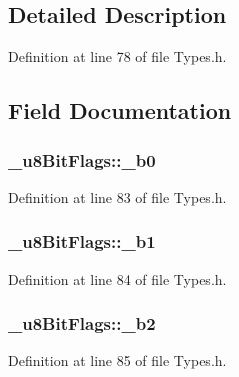 \subsection{Detailed Description}


Definition at line 78 of file Types.\+h.



\subsection{Field Documentation}
\subsubsection[{\texorpdfstring{\+\_\+b0}{_b0}}]{ \+\_\+u8\+Bit\+Flags\+::\+\_\+b0}\hypertarget{union__u8_bit_flags_a1f5f46b8e2d3b8f7e8cc504484fd3b40}{}\label{union__u8_bit_flags_a1f5f46b8e2d3b8f7e8cc504484fd3b40}


Definition at line 83 of file Types.\+h.

\subsubsection[{\texorpdfstring{\+\_\+b1}{_b1}}]{ \+\_\+u8\+Bit\+Flags\+::\+\_\+b1}\hypertarget{union__u8_bit_flags_a7f172068ad93cbd4fe886bceb87d5453}{}\label{union__u8_bit_flags_a7f172068ad93cbd4fe886bceb87d5453}


Definition at line 84 of file Types.\+h.

\subsubsection[{\texorpdfstring{\+\_\+b2}{_b2}}]{ \+\_\+u8\+Bit\+Flags\+::\+\_\+b2}\hypertarget{union__u8_bit_flags_aa268d657cf81f4254da2229854c0b034}{}\label{union__u8_bit_flags_aa268d657cf81f4254da2229854c0b034}


Definition at line 85 of file Types.\+h.

